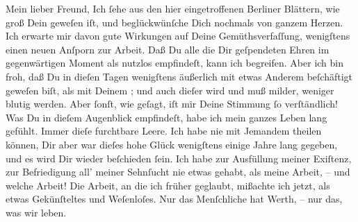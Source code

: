 \pstart{}Mein lieber Freund,\pend\vspace{0.5em}
\pstart
           Ich ſehe aus den hier eingetroffenen Berliner
               Blättern, wie groß Dein \label{K_L02874-1v}\label{K_L02874-1} geweſen iſt, und beglückwünſche Dich nochmals von ganzem Herzen. Ich
               erwarte mir davon gute Wirkungen auf Deine Gemüthsverfaſſung, wenigſtens einen neuen
               Anſporn zur Arbeit. Daß Du alle die Dir geſpendeten Ehren  im gegenwärtigen Moment als nutzlos empfindeſt, kann ich begreifen.
               Aber ich bin froh, daß Du in dieſen Tagen wenigſtens äußerlich mit etwas Anderem  beſchäftigt geweſen biſt, als mit Deinem \label{K_L02874-2v}\label{K_L02874-2}; und auch dieſer wird und muß milder, weniger {\pb}blutig werden. Aber ſonſt, wie geſagt, iſt mir Deine
               Stimmung ſo \strikeout{\textcolor{gray}{×}} verſtändlich! Was Du \strikeout{\textcolor{gray}{h}\textcolor{gray}{×}\-\textcolor{gray}{×}\-\textcolor{gray}{×}} in dieſem Augenblick \strikeout{\textcolor{gray}{em}} empfindeſt, habe ich mein ganzes Leben lang gefühlt. Immer dieſe furchtbare
               Leere. Ich habe nie mit Jemandem theilen können, Dir aber war dieſes hohe Glück
               wenigſtens einige Jahre lang gegeben, und es wird Dir \strikeout{\textcolor{gray}{wie}} wieder beſchieden ſein. Ich habe zur Ausfüllung meiner Exiſtenz, zur
               Befriedigung all’ meiner Sehnſucht nie etwas gehabt, als meine Arbeit, – und welche
               Arbeit! Die Arbeit, an die ich früher geglaubt, mißachte ich jetzt, als etwas
               Gekünſteltes und Weſenloſes. Nur das Menſchliche hat Werth, – nur das, was wir
               leben.\pend
           
